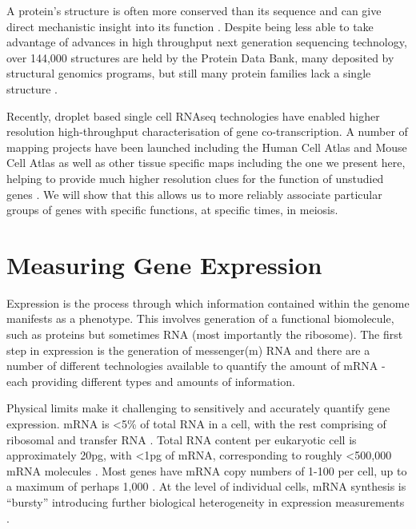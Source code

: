 A protein's structure is often more conserved than its sequence and can give direct mechanistic insight into its function \parencite{Illergard2009Structure, Sousounis2012Conservation}. Despite being less able to take advantage of advances in high throughput next generation sequencing technology, over 144,000 structures are held by the Protein Data Bank, many deposited by structural genomics programs, but still many protein families lack a single structure \parencite{wwPDBconsortium2019Protein, Grabowski2016Impact, Khafizov2014Trends}.

Recently, droplet based single cell RNAseq technologies have enabled higher resolution high-throughput characterisation of gene co-transcription. A number of mapping projects have been launched including the Human Cell Atlas and Mouse Cell Atlas as well as other tissue specific maps including the one we present here, helping to provide much higher resolution clues for the function of unstudied genes \parencite{Regev2017Human,Regev2018Human,Han2018Mapping,TheTabulaMurisConsortium2018Singlecell}. We will show that this allows us to more reliably associate particular groups of genes with specific functions, at specific times, in meiosis.


\section{Measuring Gene Expression}

Expression is the process through which information contained within the genome manifests as a phenotype. This involves generation of a functional biomolecule, such as proteins but sometimes RNA (most importantly the ribosome). The first step in expression is the generation of messenger(m) RNA and there are a number of different technologies available to quantify the amount of mRNA - each providing different types and amounts of information.

Physical limits make it challenging to sensitively and accurately quantify gene expression. mRNA is <5\% of total RNA in a cell, with the rest comprising of ribosomal and transfer RNA \parencite{Warner1999economics}. Total RNA content per eukaryotic cell is approximately 20pg, with <1pg of mRNA, corresponding to roughly <500,000 mRNA molecules \parencite{Roozemond1976Ultramicrochemical, Uemura1980Agerelated, Tang2011Development}. Most genes have mRNA copy numbers of 1-100 per cell, up to a maximum of perhaps 1,000 \parencite{Marguerat2012Quantitative, Macaulay2014Single}. At the level of individual cells, mRNA synthesis is ``bursty'' introducing further biological heterogeneity in expression measurements \parencite{Raj2006Stochastic, Chubb2006Transcriptional}.

